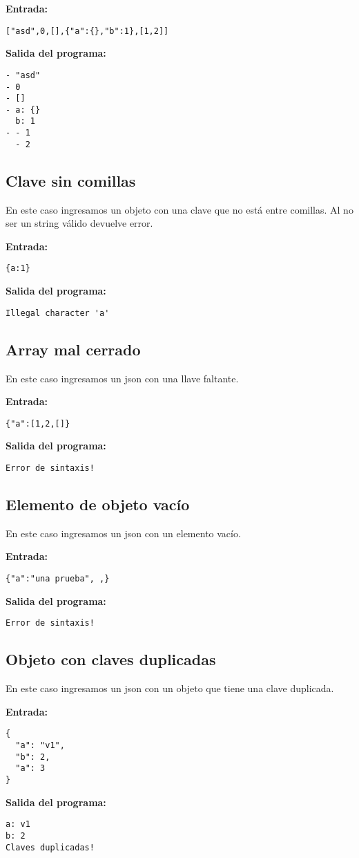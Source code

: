 \textbf{Entrada:}
\begin{verbatim}
["asd",0,[],{"a":{},"b":1},[1,2]]
\end{verbatim}

\textbf{Salida del programa:}
\begin{verbatim}
- "asd"
- 0
- []
- a: {}
  b: 1
- - 1
  - 2
\end{verbatim}

\subsection{Clave sin comillas}
En este caso ingresamos un objeto con una clave que no está entre comillas. Al no ser un string válido devuelve error.

\textbf{Entrada:}
\begin{verbatim}
{a:1}
\end{verbatim}

\textbf{Salida del programa:}
\begin{verbatim}
Illegal character 'a'
\end{verbatim}

\subsection{Array mal cerrado}
En este caso ingresamos un json con una llave faltante.

\textbf{Entrada:}
\begin{verbatim}
{"a":[1,2,[]}
\end{verbatim}

\textbf{Salida del programa:}
\begin{verbatim}
Error de sintaxis!
\end{verbatim}

\subsection{Elemento de objeto vacío}
En este caso ingresamos un json con un elemento vacío.

\textbf{Entrada:}
\begin{verbatim}
{"a":"una prueba", ,}
\end{verbatim}

\textbf{Salida del programa:}
\begin{verbatim}
Error de sintaxis!
\end{verbatim}

\subsection{Objeto con claves duplicadas}
En este caso ingresamos un json con un objeto que tiene una clave duplicada.

\textbf{Entrada:}
\begin{verbatim}
{
  "a": "v1",
  "b": 2,
  "a": 3
}
\end{verbatim}

\textbf{Salida del programa:}
\begin{verbatim}
a: v1
b: 2
Claves duplicadas!
\end{verbatim}
